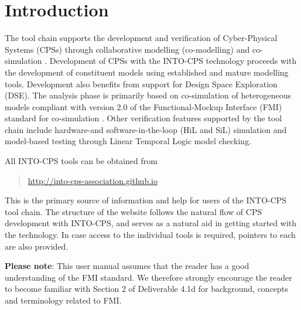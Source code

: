 \section{Introduction}\label{sec:intro}
%
The tool chain supports the development and verification of Cyber-Physical Systems (CPSs) through collaborative modelling (co-modelling) and co-si\-mul\-at\-ion \cite{Gomes&17}.
%
Development of CPSs with the INTO-CPS technology proceeds with the development of constituent models using established and mature modelling tools.
%
Development also benefits from support for Design Space Exploration (DSE).
%
The analysis phase is primarily based on co-simulation of heterogeneous models compliant with version 2.0 of the Functional-Mockup Interface (FMI) standard for co-simulation \cite{FMIStandard2.0}.
%
Other verification features supported by the tool chain include hardware-\@ and software-in-the-loop (HiL and SiL) simulation and model-based testing through Linear Temporal Logic model checking.

All INTO-CPS tools can be obtained from
%
\begin{quote}
\url{http://into-cps-association.github.io}
\end{quote}
%
%
%
This is the primary source of information and help for users of the INTO-CPS tool chain.
%
The structure of the website follows the natural flow of CPS development with INTO-CPS, and serves as a natural aid in getting started with the technology.
%
In case access to the individual tools is required, pointers to each are also provided.

\textbf{Please note}:  This user manual assumes that the reader has a good understanding of the FMI standard.
%
We therefore strongly encourage the reader to become familiar with Section 2 of Deliverable 4.1d \cite{INTOCPSD41d} for background, concepts and terminology related to FMI.

